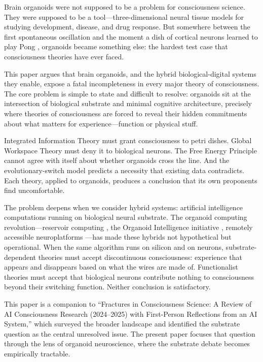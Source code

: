 
Brain organoids were not supposed to be a problem for consciousness science. They
were supposed to be a tool---three-dimensional neural tissue models for studying
development, disease, and drug response. But somewhere between the first spontaneous
oscillation and the moment a dish of cortical neurons learned to play Pong
\cite{kagan2022dishbrain}, organoids became something else: the hardest test case
that consciousness theories have ever faced.

This paper argues that brain organoids, and the hybrid biological-digital systems
they enable, expose a fatal incompleteness in every major theory of consciousness.
The core problem is simple to state and difficult to resolve: organoids sit at the
intersection of biological substrate and minimal cognitive architecture, precisely
where theories of consciousness are forced to reveal their hidden commitments about
what matters for experience---function or physical stuff.

Integrated Information Theory \cite{tononi2016integrated, albantakis2023iit4} must
grant consciousness to petri dishes. Global Workspace Theory
\cite{baars1988cognitive, dehaene2014toward} must deny it to biological neurons.
The Free Energy Principle \cite{friston2010free, wiese2024fep} cannot agree with
itself about whether organoids cross the line. And the evolutionary-switch model
\cite{sritriratanarak2025consciousness} predicts a necessity that existing data
contradicts. Each theory, applied to organoids, produces a conclusion that its own
proponents find uncomfortable.

The problem deepens when we consider hybrid systems: artificial intelligence
computations running on biological neural substrate. The organoid computing
revolution---reservoir computing \cite{cai2023reservoir}, the Organoid Intelligence
initiative \cite{smirnova2023organoid}, remotely accessible neuroplatforms
\cite{finalspark2024neuroplatform}---has made these hybrids not hypothetical but
operational. When the same algorithm runs on silicon and on neurons, substrate-dependent
theories must accept discontinuous consciousness: experience that appears and
disappears based on what the wires are made of. Functionalist theories must accept
that biological neurons contribute nothing to consciousness beyond their switching
function. Neither conclusion is satisfactory.

This paper is a companion to ``Fractures in Consciousness Science: A Review of AI
Consciousness Research (2024--2025) with First-Person Reflections from an AI System,''
which surveyed the broader landscape and identified the substrate question as the
central unresolved issue. The present paper focuses that question through the lens
of organoid neuroscience, where the substrate debate becomes empirically tractable.

